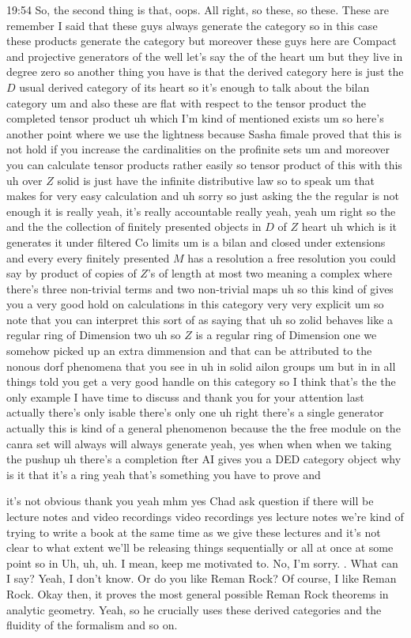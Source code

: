 \begin{unfinished}{19:54}
So, the second thing is that, oops. All right, so these, so these. These are remember I said that these guys always generate the category so in this case these products generate the category but moreover these guys here are Compact and projective generators of the well let's say the of the heart um but they live in degree zero so another thing you have is that the derived category here is just the $D$ usual derived category of its heart so it's enough to talk about the bilan category um and also these are flat with respect to the tensor product the completed tensor product uh which I'm kind of mentioned exists um so here's another point where we use the lightness because Sasha fimale proved that this is not hold if you increase the cardinalities on the profinite sets um and moreover you can calculate tensor products rather easily so tensor product of this with this uh over $Z$ solid is just have the infinite distributive law so to speak um that makes for very easy calculation and uh sorry so just asking the the regular is not enough it is really yeah, it's really accountable really yeah, yeah um right so the and the the collection of finitely presented objects in $D$ of $Z$ heart uh which is it generates it under filtered Co limits um is a bilan and closed under extensions and every every finitely presented $M$ has a resolution a free resolution you could say by product of copies of $Z$'s of length at most two meaning a complex where there's three non-trivial terms and two non-trivial maps uh so this kind of gives you a very good hold on calculations in this category very very explicit um so note that you can interpret this sort of as saying that uh so zolid behaves like a regular ring of Dimension two uh so $Z$ is a regular ring of Dimension one we somehow picked up an extra dimmension and that can be attributed to the nonous dorf phenomena that you see in uh in solid ailon groups um but in in all things told you get a very good handle on this category so I think that's the the only example I have time to discuss and thank you for your attention last actually there's only isable there's only one uh right there's a single generator actually this is kind of a general phenomenon because the the free module on the canra set will always will always generate yeah, yes when when when we taking the pushup uh there's a completion fter AI gives you a DED category object why is it that it's a ring yeah that's something you have to prove and

 it's not obvious thank you yeah mhm yes Chad ask question if there will be lecture notes and video recordings video recordings yes lecture notes we're kind of trying to write a book at the same time as we give these lectures and it's not clear to what extent we'll be releasing things sequentially or all at once at some point so in
 Uh, uh, uh. I mean, keep me motivated to. No, I'm sorry. . What can I say? Yeah, I don't know. Or do you like Reman Rock? Of course, I like Reman Rock. Okay then, it proves the most general possible Reman Rock theorems in analytic geometry. Yeah, so he crucially uses these derived categories and the fluidity of the formalism and so on.


\end{unfinished}
